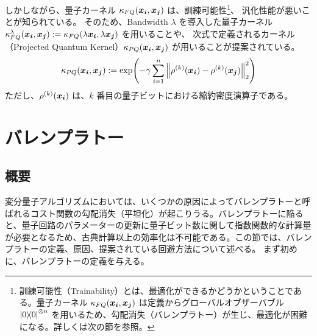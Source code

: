 しかしながら、量子カーネル $\kappa_{FQ}(\boldsymbol{x_i},\boldsymbol{x_j})$ は、訓練可能性\footnote{訓練可能性（Trainability）とは、最適化ができるかどうかということである。量子カーネル $\kappa_{FQ}(\boldsymbol{x_i},\boldsymbol{x_j})$ は定義からグローバルオブザーバブル $\dyad{0}\otn{n}$ を用いるため、勾配消失（バレンプラトー）が生じ、最適化が困難になる。詳しくは次の節を参照。}、
汎化性能が悪いことが知られている\cite{thanasilp2022exponential,huang2021power,kubler2021inductive}。
そのため、Bandwidth $\lambda$ を導入した量子カーネル $\kappa_{FQ}^\lambda(\boldsymbol{x_i},\boldsymbol{x_j}) := \kappa_{FQ}(\lambda \boldsymbol{x_i},\lambda \boldsymbol{x_j})$ を用いること\cite{shaydulin2022importance,canatar2023bandwidth}や、
次式で定義されるカーネル（Projected Quantum Kernel）$\kappa_{PQ}(\boldsymbol{x_i},\boldsymbol{x_j})$ が用いることが提案されている\cite{huang2021power}。
\begin{align}
    \kappa_{PQ}(\boldsymbol{x_i},\boldsymbol{x_j}) := \exp(- \gamma\sum_{i=1}^{n}\norm{\rho^{(k)}(\boldsymbol{x_i}) - \rho^{(k)}(\boldsymbol{x_j})}_2^2)
\end{align}
ただし、$\rho^{(k)}(\boldsymbol{x_i})$ は、$k$ 番目の量子ビットにおける縮約密度演算子である。


\section{バレンプラトー}\label{sec:bp}
\subsection{概要}
変分量子アルゴリズムにおいては、いくつかの原因によってバレンプラトーと呼ばれるコスト関数の勾配消失（平坦化）が起こりうる\cite{mcclean2018barren}。バレンプラトーに陥ると、量子回路のパラメーターの更新に量子ビット数に関して指数関数的な計算量が必要となるため、古典計算以上の効率化は不可能である。この節では、バレンプラトーの定義、原因、提案されている回避方法について述べる。
まず初めに、バレンプラトーの定義を与える。

